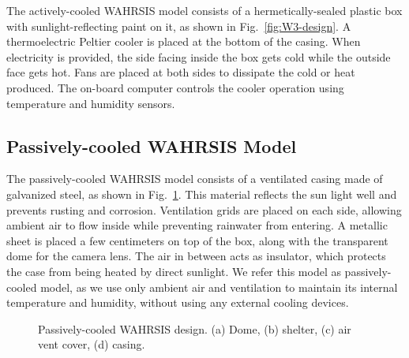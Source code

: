 The actively-cooled WAHRSIS model consists of a hermetically-sealed plastic box with sunlight-reflecting paint on it, as shown in Fig.~\ref{fig:W3-design}. A thermoelectric Peltier cooler is placed at the bottom of the casing. When electricity is provided, the side facing inside the box gets cold while the outside face gets hot. Fans are placed at both sides to dissipate the cold or heat produced. The on-board computer controls the cooler operation using temperature and humidity sensors. 





\subsection{Passively-cooled WAHRSIS Model} 
The passively-cooled WAHRSIS model consists of a ventilated casing made of galvanized steel, as shown in Fig.~\ref{fig:version2}. This material reflects the sun light well and prevents rusting and corrosion. Ventilation grids are placed on each side, allowing ambient air to flow inside while preventing rainwater from entering. A metallic sheet is placed a few centimeters on top of the box, along with the transparent dome for the camera lens. The air in between acts as insulator, which protects the case from being heated by direct sunlight. We refer this model as passively-cooled model, as we use only ambient air and ventilation to maintain its internal temperature and humidity, without using any external cooling devices. 

\begin{figure}[htb]
\centering
{}
\caption[Passively-cooled WAHRSIS design along with its different components.]{Passively-cooled WAHRSIS design. (a) Dome, (b) shelter, (c) air vent cover, (d) casing. }
\label{fig:version2}
\end{figure}


